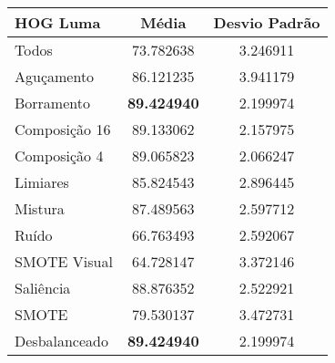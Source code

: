 \begin{table}[!htbp]
\centering
\caption{}
\label{tab:resultados:x:melhor}
\begin{tabular}{|l|c|c|}
\hline
\textbf{HOG Luma} & \textbf{Média}     & \textbf{Desvio Padrão} \\ \hline
   Todos        &  73.782638 &  3.246911  \\ \hline
  Aguçamento    &  86.121235 &  3.941179  \\ \hline
  Borramento    &  \textbf{89.424940} &  2.199974  \\ \hline
  Composição 16 &  89.133062 &  2.157975  \\ \hline
  Composição 4  &  89.065823 &  2.066247  \\ \hline
  Limiares      &  85.824543 &  2.896445  \\ \hline
  Mistura       &  87.489563 &  2.597712  \\ \hline
  Ruído         &  66.763493 &  2.592067  \\ \hline
  SMOTE Visual  &  64.728147 &  3.372146  \\ \hline
  Saliência     &  88.876352 &  2.522921  \\ \hline
 SMOTE          &  79.530137 &  3.472731  \\ \hline
Desbalanceado   &  \textbf{89.424940} &  2.199974  \\ \hline
\end{tabular}
\end{table}



